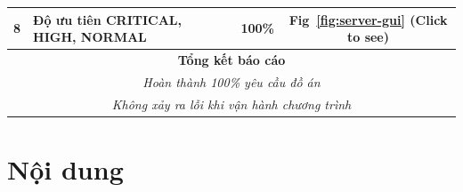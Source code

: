 \documentclass[a4paper,12pt]{report}
\begin{document}
\begin{center}
\begin{tabular}{|c|p{}|c|c|}
    8            & Độ ưu tiên CRITICAL, HIGH, NORMAL                                                                        & 100\%            & Fig~\ref{fig:server-gui} (Click to see) \\\hline
    \multicolumn{4}{|c|}{\textbf{Tổng kết báo cáo}}                                                                                                                                      \\
    \multicolumn{4}{|c|}{\textsl{Hoàn thành 100\% yêu cầu đồ án}}                                                                                                                        \\
    \multicolumn{4}{|c|}{\textsl{Không xảy ra lỗi khi vận hành chương trình}}                                                                                                            \\\hline
  \end{tabular}
\end{center}

\pagebreak
\section{Nội dung}
\end{document}
